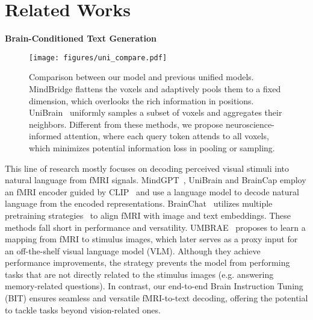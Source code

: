\section{Related Works}
\noindent\textbf{Brain-Conditioned Text Generation}
\begin{figure}
    \centering
    \texttt{[image: figures/uni\_compare.pdf]}
    \vspace{-2em}
    \caption{Comparison between our model and previous unified models. MindBridge \cite{wang2024mindbridge} flattens the voxels and adaptively pools them to a fixed dimension, which overlooks the rich information in positions. UniBrain~ \cite{wang2024unibrain} uniformly samples a subset of voxels and aggregates their neighbors. Different from these methods, we propose neuroscience-informed attention, where each query token attends to all voxels, which minimizes potential information loss in pooling or sampling.}
    \label{fig:uni_compare}
    \vspace{-1em}
\end{figure}
This line of research mostly focuses on decoding perceived visual stimuli into natural language from fMRI signals. MindGPT~\cite{chen2023mindgpt}, UniBrain\cite{mai2023unibrain} and BrainCap \cite{ferrante2023brain} employ an fMRI encoder guided by CLIP~\cite{radford2021learning} and use a language model \cite{radford2019language,wang2022git} to decode natural language from the encoded representations. BrainChat~\cite{huang2024brainchat} utilizes multiple pretraining strategies~\cite{devlin2018bert, he2022masked,yu2022coca} to align fMRI with image and text embeddings. These methods fall short in performance and versatility. UMBRAE~\cite{xia2024umbrae} proposes to learn a mapping from fMRI to stimulus images, which later serves as a proxy input for an off-the-shelf visual language model (VLM). Although they achieve performance improvements, the strategy prevents the model from performing tasks that are not directly related to the stimulus images (e.g. answering memory-related questions). In contrast, our end-to-end Brain Instruction Tuning (BIT) ensures seamless and versatile fMRI-to-text decoding, offering the potential to tackle tasks beyond vision-related ones.

